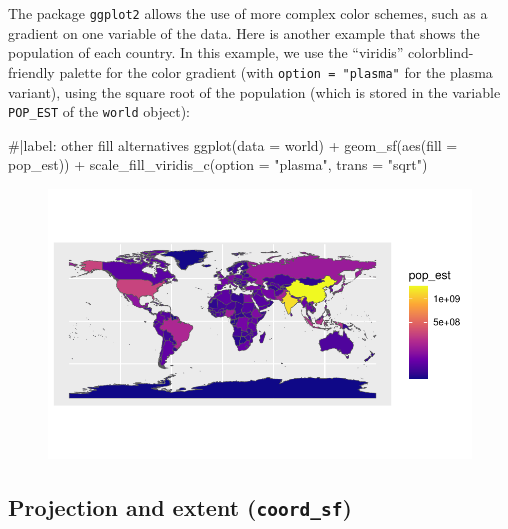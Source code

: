 \documentclass[
  letterpaper,
  DIV=11,
  numbers=noendperiod]{scrartcl}
\newenvironment{Shaded}{\begin{snugshade}}{\end{snugshade}}
\newcommand{\AttributeTok}[1]{\textcolor[rgb]{0.40,0.45,0.13}{#1}}
\newcommand{\CommentTok}[1]{\textcolor[rgb]{0.37,0.37,0.37}{#1}}
\newcommand{\FunctionTok}[1]{\textcolor[rgb]{0.28,0.35,0.67}{#1}}
\newcommand{\NormalTok}[1]{\textcolor[rgb]{0.00,0.23,0.31}{#1}}
\newcommand{\SpecialCharTok}[1]{\textcolor[rgb]{0.37,0.37,0.37}{#1}}
\newcommand{\StringTok}[1]{\textcolor[rgb]{0.13,0.47,0.30}{#1}}
\begin{document}
The package \texttt{ggplot2} allows the use of more complex color
schemes, such as a gradient on one variable of the data. Here is another
example that shows the population of each country. In this example, we
use the ``viridis'' colorblind-friendly palette for the color gradient
(with \texttt{option\ =\ "plasma"} for the plasma variant), using the
square root of the population (which is stored in the variable
\texttt{POP\_EST} of the \texttt{world} object):

\begin{Shaded}
\begin{Highlighting}[]
\CommentTok{\#|label: other fill alternatives}
\FunctionTok{ggplot}\NormalTok{(}\AttributeTok{data =}\NormalTok{ world) }\SpecialCharTok{+}     
  \FunctionTok{geom\_sf}\NormalTok{(}\FunctionTok{aes}\NormalTok{(}\AttributeTok{fill =}\NormalTok{ pop\_est)) }\SpecialCharTok{+}     
  \FunctionTok{scale\_fill\_viridis\_c}\NormalTok{(}\AttributeTok{option =} \StringTok{"plasma"}\NormalTok{, }\AttributeTok{trans =} \StringTok{"sqrt"}\NormalTok{) }
\end{Highlighting}
\end{Shaded}

\begin{figure}[H]

{\centering \includegraphics{Introduction-to-mapping_files/figure-pdf/unnamed-chunk-9-1.pdf}

}

\end{figure}

\hypertarget{projection-and-extent-coord_sf}{%
\subsection{\texorpdfstring{Projection and extent
(\texttt{coord\_sf})}{Projection and extent (coord\_sf)}}\label{projection-and-extent-coord_sf}}
\end{document}
